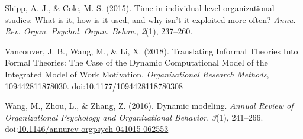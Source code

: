 \documentclass[english,,man]{apa6}
\theoremstyle{definition}
\theoremstyle{definition}
\theoremstyle{definition}
\theoremstyle{remark}
\begin{document}
\leavevmode\hypertarget{ref-shipp_time_2015}{}%
Shipp, A. J., \& Cole, M. S. (2015). Time in individual-level
organizational studies: What is it, how is it used, and why isn't it
exploited more often? \emph{Annu. Rev. Organ. Psychol. Organ. Behav.},
\emph{2}(1), 237--260.

\leavevmode\hypertarget{ref-vancouver_translating_2018}{}%
Vancouver, J. B., Wang, M., \& Li, X. (2018). Translating Informal
Theories Into Formal Theories: The Case of the Dynamic Computational
Model of the Integrated Model of Work Motivation. \emph{Organizational
Research Methods}, 109442811878030.
doi:\href{https://doi.org/10.1177/1094428118780308}{10.1177/1094428118780308}

\leavevmode\hypertarget{ref-Wang2016}{}%
Wang, M., Zhou, L., \& Zhang, Z. (2016). Dynamic modeling. \emph{Annual
Review of Organizational Psychology and Organizational Behavior},
\emph{3}(1), 241--266.
doi:\href{https://doi.org/10.1146/annurev-orgpsych-041015-062553}{10.1146/annurev-orgpsych-041015-062553}
\end{document}

